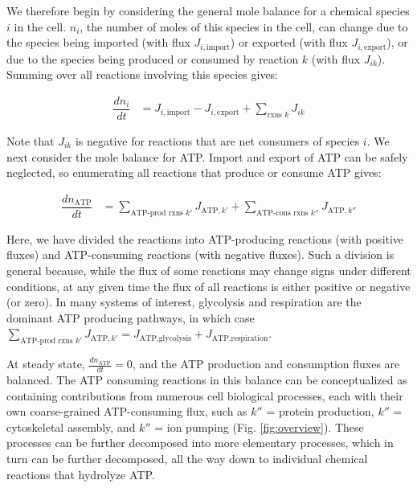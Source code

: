 \documentclass{compactarticle}
\begin{document}
We therefore begin by considering the general mole balance for a chemical species $ i $  in the cell. $n_i$, the number of moles of this species in the cell, can change due to the species being imported (with flux $ J_{i,\text{import}} $) or exported (with flux $ J_{i,\text{export}} $), or due to the species being produced or consumed by reaction $ k $ (with flux $ J_{ik}$). Summing over all reactions involving this species gives:

\begin{align}
    \dfrac{dn_i}{dt} &= J_{i,\text{import}} - J_{i,\text{export}} + \sum_{\text{rxns } k} J_{ik}
    \label{eq:fluxes1a}
\end{align}

\noindent Note that $ J_{ik} $ is negative for reactions that are net consumers of species $ i $. We next consider the mole balance for ATP. Import and export of ATP can be safely neglected, so enumerating all reactions that produce or consume ATP gives:

\begin{align}
    \dfrac{dn_\text{ATP}}{dt} &= \sum_{\text{ATP-prod rxns } k'} J_{\text{ATP},k'} + \sum_{\text{ATP-cons rxns } k''} J_{\text{ATP},k''}
    \label{eq:fluxes1b}
\end{align}

\noindent Here, we have divided the reactions into ATP-producing reactions (with positive fluxes) and ATP-consuming reactions (with negative fluxes). Such a division is general because, while the flux of some reactions may change signs under different conditions, at any given time the flux of all reactions is either positive or negative (or zero). In many systems of interest, glycolysis and respiration are the dominant ATP producing pathways, in which case  $\sum_{\text{ATP-prod rxns } k'} J_{\text{ATP},k'} = J_\text{ATP,glycolysis} + J_\text{ATP,respiration}$.  


At steady state, $ \frac{dn_\text{ATP}}{dt} = 0$, and the ATP production and consumption fluxes are balanced. The ATP consuming reactions in this balance can be conceptualized as containing contributions from numerous cell biological processes, each with their own coarse-grained ATP-consuming flux, such as $k''$ = protein production, $k''$ = cytoskeletal assembly, and $k''$ = ion pumping (Fig. \ref{fig:overview}). These processes can be further decomposed into more elementary processes, which in turn can be further decomposed, all the way down to individual chemical reactions that hydrolyze ATP.
\end{document}

